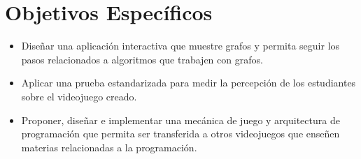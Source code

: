 \section{Objetivos Específicos}

\begin{itemize}

\item Diseñar una aplicación interactiva que muestre grafos y permita seguir los pasos relacionados a
algoritmos que trabajen con grafos.

\item Aplicar una prueba estandarizada para medir la percepción de los estudiantes sobre el videojuego creado.

\item Proponer, diseñar e implementar una mecánica de juego y arquitectura de programación que permita ser transferida a 
otros videojuegos que enseñen materias relacionadas a la programación. 


\end{itemize}


